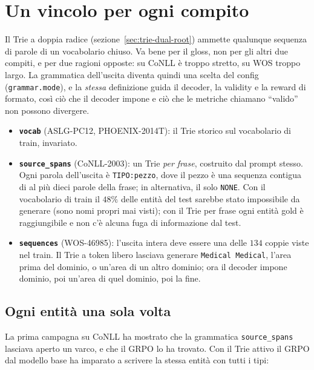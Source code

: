 \section{Un vincolo per ogni compito}
\label{sec:vincolo-per-compito}

Il Trie a doppia radice (sezione~\ref{sec:trie-dual-root}) ammette qualunque
sequenza di parole di un vocabolario chiuso. Va bene per il gloss, non per gli
altri due compiti, e per due ragioni opposte: su CoNLL è troppo stretto, su WOS
troppo largo. La grammatica dell'uscita diventa quindi una scelta del config
(\texttt{grammar.mode}), e la \emph{stessa} definizione guida il decoder, la
validity e la reward di formato, così ciò che il decoder impone e ciò che le
metriche chiamano ``valido'' non possono divergere.

\begin{itemize}
  \item \textbf{\texttt{vocab}} (ASLG-PC12, PHOENIX-2014T): il Trie storico sul
        vocabolario di train, invariato.
  \item \textbf{\texttt{source\_spans}} (CoNLL-2003): un Trie \emph{per frase},
        costruito dal prompt stesso. Ogni parola dell'uscita è
        \texttt{TIPO:pezzo}, dove il pezzo è una sequenza contigua di al più
        dieci parole della frase; in alternativa, il solo \texttt{NONE}. Con il
        vocabolario di train il $48\%$ delle entità del test sarebbe stato
        impossibile da generare (sono nomi propri mai visti); con il Trie per
        frase ogni entità gold è raggiungibile e non c'è alcuna fuga di
        informazione dal test.
  \item \textbf{\texttt{sequences}} (WOS-46985): l'uscita intera deve essere
        una delle $134$ coppie viste nel train. Il Trie a token libero lasciava
        generare \texttt{Medical Medical}, l'area prima del dominio, o un'area
        di un altro dominio; ora il decoder impone dominio, poi un'area di quel
        dominio, poi la fine.
\end{itemize}

\subsection{Ogni entità una sola volta}
\label{sec:span-unici}

La prima campagna su CoNLL ha mostrato che la grammatica \texttt{source\_spans}
lasciava aperto un varco, e che il GRPO lo ha trovato. Con il Trie attivo il
GRPO dal modello base ha imparato a scrivere la stessa entità con tutti i tipi:

